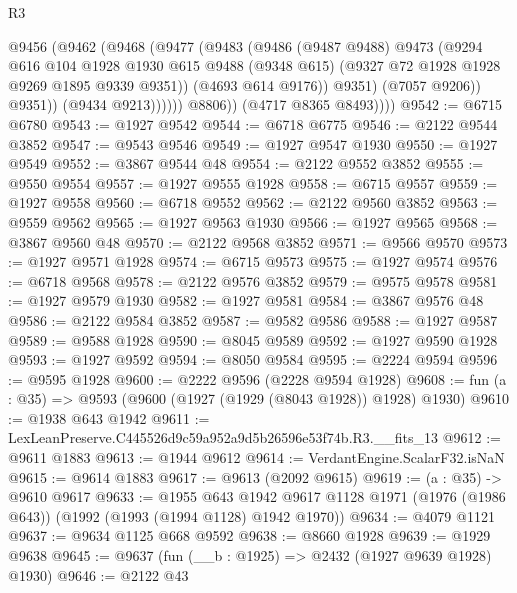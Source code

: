 \begin{lexlean}{R3}
\begin{coremodule}
                      @9456
                        (@9462
                          (@9468
                            (@9477
                              (@9483
                                (@9486
                                  (@9487 @9488)
                                  @9473
                                  (@9294
                                    @616
                                    @104
                                    @1928
                                    @1930
                                    @615
                                    @9488
                                    (@9348 @615)
                                    (@9327 @72 @1928 @1928 @9269 @1895 @9339 @9351))
                                  (@4693 @614 @9176))
                                @9351)
                              (@7057 @9206))
                            @9351))
                        (@9434 @9213))))))
              @8806))
          (@4717 @8365 @8493))))
@9542 := @6715 @6780
@9543 := @1927 @9542
@9544 := @6718 @6775
@9546 := @2122 @9544 @3852
@9547 := @9543 @9546
@9549 := @1927 @9547 @1930
@9550 := @1927 @9549
@9552 := @3867 @9544 @48
@9554 := @2122 @9552 @3852
@9555 := @9550 @9554
@9557 := @1927 @9555 @1928
@9558 := @6715 @9557
@9559 := @1927 @9558
@9560 := @6718 @9552
@9562 := @2122 @9560 @3852
@9563 := @9559 @9562
@9565 := @1927 @9563 @1930
@9566 := @1927 @9565
@9568 := @3867 @9560 @48
@9570 := @2122 @9568 @3852
@9571 := @9566 @9570
@9573 := @1927 @9571 @1928
@9574 := @6715 @9573
@9575 := @1927 @9574
@9576 := @6718 @9568
@9578 := @2122 @9576 @3852
@9579 := @9575 @9578
@9581 := @1927 @9579 @1930
@9582 := @1927 @9581
@9584 := @3867 @9576 @48
@9586 := @2122 @9584 @3852
@9587 := @9582 @9586
@9588 := @1927 @9587
@9589 := @9588 @1928
@9590 := @8045 @9589
@9592 := @1927 @9590 @1928
@9593 := @1927 @9592
@9594 := @8050 @9584
@9595 := @2224 @9594
@9596 := @9595 @1928
@9600 := @2222 @9596 (@2228 @9594 @1928)
@9608 := fun (a : @35) => @9593 (@9600 (@1927 (@1929 (@8043 @1928)) @1928) @1930)
@9610 := @1938 @643 @1942
@9611 := LexLeanPreserve.C445526d9c59a952a9d5b26596e53f74b.R3.__fits_13
@9612 := @9611 @1883
@9613 := @1944 @9612
@9614 := VerdantEngine.ScalarF32.isNaN
@9615 := @9614 @1883
@9617 := @9613 (@2092 @9615)
@9619 := (a : @35) -> @9610 @9617
@9633 := @1955
    @643
    @1942
    @9617
    @1128
    @1971
    (@1976 (@1986 @643))
    (@1992 (@1993 (@1994 @1128) @1942 @1970))
@9634 := @4079 @1121
@9637 := @9634 @1125 @668 @9592
@9638 := @8660 @1928
@9639 := @1929 @9638
@9645 := @9637 (fun (__b : @1925) => @2432 (@1927 @9639 @1928) @1930)
@9646 := @2122 @43

\end{coremodule}
\end{lexlean}
